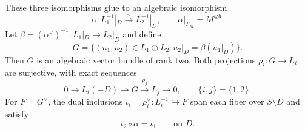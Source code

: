 \begin{proposition}\label{prop:construction}
These three isomorphisms glue to an algebraic isomorphism
\begin{equation}\label{eq:alpha}
 \alpha:L_1^{-1}|_D\xrightarrow{\sim}L_2^{-1}|_D,
 \qquad \alpha|_{\Gamma_M}=M^{\otimes b}.
\end{equation}
Let $\beta=(\alpha^\vee)^{-1}:L_1|_D\to L_2|_D$ and define
\begin{equation}\label{eq:equalizer}
 G=\bigl\{(u_1,u_2)\in L_1\oplus L_2:
          u_2|_D=\beta(u_1|_D)\bigr\}.
\end{equation}
Then $G$ is an algebraic vector bundle of rank two. Both projections
$\rho_i:G\to L_i$ are surjective, with exact sequences
\begin{equation}\label{eq:quotient-sequences}
 0\longrightarrow L_i(-D)\longrightarrow G
   \xrightarrow{\rho_j}L_j\longrightarrow0,
 \qquad \{i,j\}=\{1,2\}.
\end{equation}
For $F=G^\vee$, the dual inclusions
$\iota_i=\rho_i^\vee:L_i^{-1}\hookrightarrow F$ span each fiber
over $S\setminus D$ and satisfy
\begin{equation}\label{eq:dual-gluing}
 \iota_2\circ\alpha=\iota_1\qquad\text{on }D.
\end{equation}
\end{proposition}


